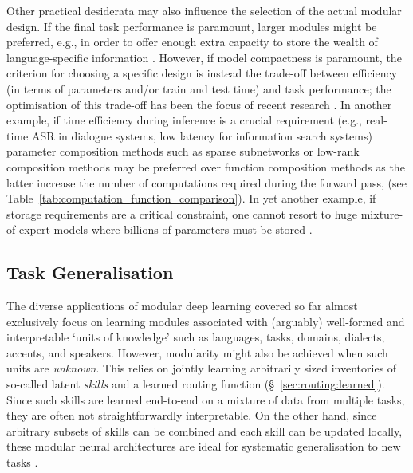 \documentclass[10pt]{article} %
\begin{document}
Other practical desiderata may also influence the selection of the actual modular design. If the final task performance is paramount, larger modules might be preferred, e.g., in order to offer enough extra capacity to store the wealth of language-specific information \citep{ansell2021composable}. However, if model compactness is paramount, the criterion for choosing a specific design is instead the trade-off between efficiency (in terms of parameters and/or train and test time) and task performance; the optimisation of this trade-off has been the focus of recent research \citep{Rueckle2021AdapterDrop,Mahabadi2021Compacter,mahabadi2021parameter,Sun:2022bbtv2}. In another example, if time efficiency during inference is a crucial requirement (e.g., real-time ASR in dialogue systems, low latency for information search systems) parameter composition methods such as sparse subnetworks or low-rank composition methods may be preferred over function composition methods as the latter increase the number of computations required during the forward pass, (see Table~\ref{tab:computation_function_comparison}). In yet another example, if storage requirements are a critical constraint, one cannot resort to huge mixture-of-expert models where billions of parameters must be stored \citep{Lepikhin2021GShard}.

\subsection{Task Generalisation}
\label{ssec:task_gen}
The diverse applications of modular deep learning covered so far almost exclusively focus on learning modules associated with (arguably) well-formed and interpretable `units of knowledge' such as languages, tasks, domains, dialects, accents, and speakers. However, modularity might also be achieved when such units are \textit{unknown}. This relies on jointly learning arbitrarily sized inventories of so-called latent \textit{skills} and a learned routing function (\S~\ref{sec:routing:learned}). Since such skills are learned end-to-end on a mixture of data from multiple tasks, they are often not straightforwardly interpretable. On the other hand, since arbitrary subsets of skills can be combined and each skill can be updated locally, these modular neural architectures are ideal for systematic generalisation to new tasks \citep{Zhang2022SkillNet,ponti2022combining}. 
\end{document}
